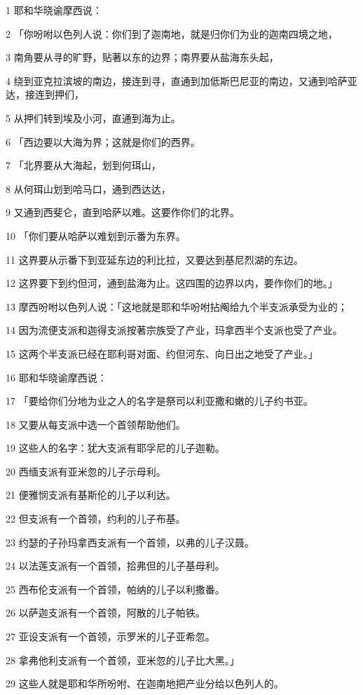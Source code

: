 \par 1 耶和华晓谕摩西说：
\par 2 「你吩咐以色列人说：你们到了迦南地，就是归你们为业的迦南四境之地，
\par 3 南角要从寻的旷野，贴著以东的边界；南界要从盐海东头起，
\par 4 绕到亚克拉滨坡的南边，接连到寻，直通到加低斯巴尼亚的南边，又通到哈萨亚达，接连到押们，
\par 5 从押们转到埃及小河，直通到海为止。
\par 6 「西边要以大海为界；这就是你们的西界。
\par 7 「北界要从大海起，划到何珥山，
\par 8 从何珥山划到哈马口，通到西达达，
\par 9 又通到西斐仑，直到哈萨以难。这要作你们的北界。
\par 10 「你们要从哈萨以难划到示番为东界。
\par 11 这界要从示番下到亚延东边的利比拉，又要达到基尼烈湖的东边。
\par 12 这界要下到约但河，通到盐海为止。这四围的边界以内，要作你们的地。」
\par 13 摩西吩咐以色列人说：「这地就是耶和华吩咐拈阄给九个半支派承受为业的；
\par 14 因为流便支派和迦得支派按著宗族受了产业，玛拿西半个支派也受了产业。
\par 15 这两个半支派已经在耶利哥对面、约但河东、向日出之地受了产业。」
\par 16 耶和华晓谕摩西说：
\par 17 「要给你们分地为业之人的名字是祭司以利亚撒和嫩的儿子约书亚。
\par 18 又要从每支派中选一个首领帮助他们。
\par 19 这些人的名字：犹大支派有耶孚尼的儿子迦勒。
\par 20 西缅支派有亚米忽的儿子示母利。
\par 21 便雅悯支派有基斯伦的儿子以利达。
\par 22 但支派有一个首领，约利的儿子布基。
\par 23 约瑟的子孙玛拿西支派有一个首领，以弗的儿子汉聂。
\par 24 以法莲支派有一个首领，拾弗但的儿子基母利。
\par 25 西布伦支派有一个首领，帕纳的儿子以利撒番。
\par 26 以萨迦支派有一个首领，阿散的儿子帕铁。
\par 27 亚设支派有一个首领，示罗米的儿子亚希忽。
\par 28 拿弗他利支派有一个首领，亚米忽的儿子比大黑。」
\par 29 这些人就是耶和华所吩咐、在迦南地把产业分给以色列人的。

